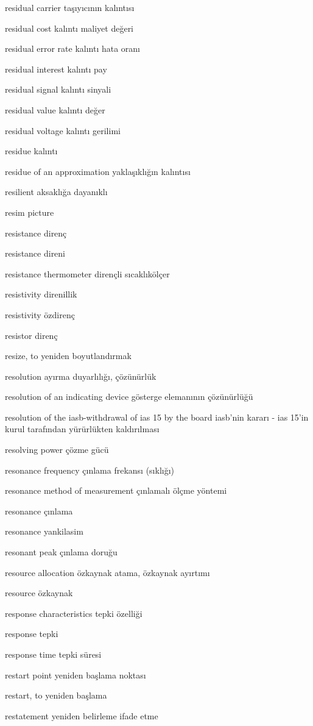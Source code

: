 \documentclass[12pt,fleqn]{article}\usepackage{../../common}
\begin{document}
residual carrier taşıyıcının kalıntısı

residual cost kalıntı maliyet değeri

residual error rate kalıntı hata oranı

residual interest kalıntı pay

residual signal kalıntı sinyali

residual value kalıntı değer

residual voltage kalıntı gerilimi

residue kalıntı

residue of an approximation yaklaşıklığın kalıntısı

resilient aksaklığa dayanıklı

resim picture

resistance direnç

resistance direni

resistance thermometer dirençli sıcaklıkölçer

resistivity direnillik

resistivity özdirenç

resistor direnç

resize, to yeniden boyutlandırmak

resolution ayırma duyarlılığı, çözünürlük

resolution of an indicating device gösterge elemanının çözünürlüğü

resolution of the iasb-withdrawal of ias 15 by the board iasb'nin kararı - ias 15'in kurul tarafından yürürlükten kaldırılması

resolving power çözme gücü

resonance frequency çınlama frekansı (sıklığı)

resonance method of measurement çınlamalı ölçme yöntemi

resonance çınlama

resonance yankilasim

resonant peak çınlama doruğu

resource allocation özkaynak atama, özkaynak ayırtımı

resource özkaynak

response characteristics tepki özelliği

response tepki

response time tepki süresi

restart point yeniden başlama noktası

restart, to yeniden başlama

restatement yeniden belirleme ifade etme
\end{document}

